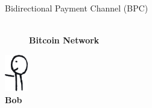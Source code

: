 \documentclass[]{beamer}
\begin{document}
\begin{frame}{Bidirectional Payment Channel (BPC)}
\begin{minipage}{0.8\linewidth}
\begin{figure}
			\centering
			\resizebox{3cm}{!}{
				\begin{tikzpicture}[scale=1, every node/.style={scale=1}]
					
			\end{tikzpicture}}\\
			\textbf{Bitcoin Network}
		\end{figure}
		\vspace{-2.9cm}	
	\end{minipage}%
\begin{minipage}{0.1\linewidth}
	\vspace{1.46cm}
	\centering
		\includegraphics[width=1cm]{../assets/images/agents/handing_left}
		\\ \hspace{0.3cm}\textbf{Bob}
		\vspace{-0.5cm}
		\begin{figure}
		\hspace{-1.7cm}
		\resizebox{2.5cm}{!}{
				\begin{tikzpicture}[scale=0.7, every node/.style={scale=0.7}]
					
				\end{tikzpicture}}
		\end{figure}
	
\end{minipage}



\end{frame}
\end{document}
